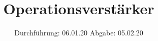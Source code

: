 

\subject{V51}
\title{Operationsverstärker}
\date{%
  Durchführung: 06.01.20
  \hspace{3em}
  Abgabe: 05.02.20
}



\maketitle
\thispagestyle{empty}
\tableofcontents
\newpage



%




\printbibliography{}


